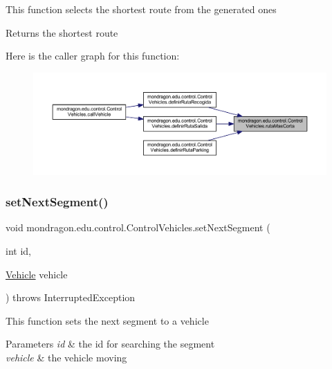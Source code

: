 This function selects the shortest route from the generated ones

\begin{DoxyReturn}{Returns}
the shortest route 
\end{DoxyReturn}
Here is the caller graph for this function\+:\nopagebreak
\begin{figure}[H]
\begin{center}
\leavevmode
\includegraphics[width=350pt]{classmondragon_1_1edu_1_1control_1_1_control_vehicles_a634e96280352f4014334a21e8bac60b1_icgraph}
\end{center}
\end{figure}
\mbox{\label{classmondragon_1_1edu_1_1control_1_1_control_vehicles_acb4522d3a0e767ed873b602dd78d9c7b}} 
\subsubsection{\texorpdfstring{setNextSegment()}{setNextSegment()}}
{\footnotesize\ttfamily void mondragon.\+edu.\+control.\+Control\+Vehicles.\+set\+Next\+Segment (\begin{DoxyParamCaption}\item[{int}]{id,  }\item[{\mbox{\hyperlink{classmondragon_1_1edu_1_1clases_1_1_vehicle}{Vehicle}}}]{vehicle }\end{DoxyParamCaption}) throws Interrupted\+Exception\hspace{0.3cm}{\ttfamily [inline]}}

This function sets the next segment to a vehicle


\begin{DoxyParams}{Parameters}
{\em id} & the id for searching the segment \\
\hline
{\em vehicle} & the vehicle moving \\
\hline
\end{DoxyParams}

